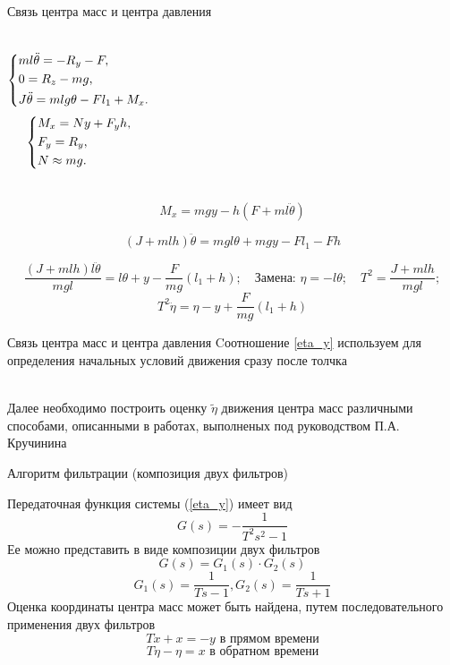 \documentclass[10pt]{beamer}
\begin{document}
\begin{frame}{Связь центра масс и центра давления}
	\begin{columns}
		\begin{equation}\label{init_cond_1}
			\left\{ {\begin{aligned}
						 & ml\ddot{\theta} = -R_y-F , \hfill             \\
						 & 0=R_z-mg, \hfill                              \\
						 & J \ddot{\theta} = mlg\theta-Fl_1+M_x . \hfill \\
					\end{aligned}} \right.
		\end{equation}
		\begin{equation}\label{init_cond_2}
			\left\{ {\begin{aligned}
						 & M_x = Ny+F_yh , \hfill \\
						 & F_y = R_y , \hfill     \\
						 & N \approx mg . \hfill  \\
					\end{aligned}} \right.
		\end{equation}
	\end{columns}

	$$M_x=mgy-h\left(F+ml\ddot{\theta}\right)$$

	$$\left(J+mlh\right)\ddot{\theta}=mgl\theta+mgy-Fl_1-Fh$$


	$$\frac{(J+mlh)l\ddot{\theta}}{mgl}=l\theta+y-\frac{F}{mg}(l_1+h);\quad \text{Замена: }\eta=-l\theta; \quad T^2=\frac{J+mlh}{mgl};$$
	\begin{equation}\label{eta_y}
		T^2\ddot{\eta}=\eta-y+\frac{F}{mg}(l_1+h)
	\end{equation}

\end{frame}

\begin{frame}{Связь центра масс и центра давления}
	Cоотношение \eqref{eta_y} используем для определения начальных условий движения сразу после толчка

	\hfill \\
	Далее необходимо построить оценку $\tilde\eta$ движения центра масс различными способами, описанными в работах, выполненых под руководством П.А. Кручинина
\end{frame}


\begin{frame}{Алгоритм фильтрации (композиция двух фильтров)}

	Передаточная функция системы (\ref*{eta_y}) имеет вид
	\[
		G(s)=-\frac{1}{T^2s^2-1}
	\]
	Ее можно представить в виде композиции двух фильтров
	\[
		G(s)=G_1(s)\cdot G_2(s)
	\]
	\[
		G_1(s)=\frac{1}{Ts-1}, G_2(s)=\frac{1}{Ts+1}
	\]
	Оценка координаты центра масс может быть найдена, путем последовательного применения двух фильтров
	\[
		T \dot{x}+x=-y \text{ в прямом времени}
	\]
	\[
		T \dot{\eta}-\eta=x \text{ в обратном времени}
	\]

\end{frame}
\end{document}
